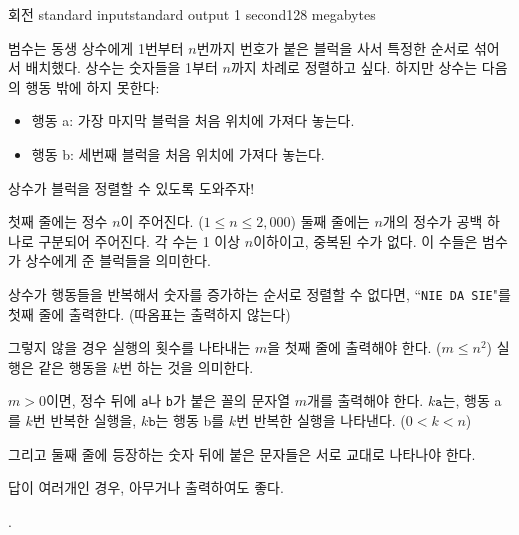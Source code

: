\begin{problem}{회전}
	{standard input}{standard output}
	{1 second}{128 megabytes}{}
	
	
	범수는 동생 상수에게 1번부터 $n$번까지 번호가 붙은 블럭을 사서 특정한 순서로 섞어서 배치했다. 상수는 숫자들을 1부터 $n$까지 차례로 정렬하고 싶다. 하지만 상수는 다음의 행동 밖에 하지 못한다:
	
	\begin{itemize}
		\item 행동 a: 가장 마지막 블럭을 처음 위치에 가져다 놓는다.
		\item 행동 b: 세번째 블럭을 처음 위치에 가져다 놓는다.
	\end{itemize}
	
	상수가 블럭을 정렬할 수 있도록 도와주자!
	
	
	\InputFile
	
	첫째 줄에는 정수 $n$이 주어진다. ($1 \le n \le 2,000$) 둘째 줄에는 $n$개의 정수가 공백 하나로 구분되어 주어진다. 각 수는 1 이상 $n$이하이고, 중복된 수가 없다. 이 수들은 범수가 상수에게 준 블럭들을 의미한다.
	
	\OutputFile
	
	상수가 행동들을 반복해서 숫자를 증가하는 순서로 정렬할 수 없다면,  ``\texttt{NIE DA SIE}"를 첫째 줄에 출력한다. (따옴표는 출력하지 않는다)

	그렇지 않을 경우 실행의 횟수를 나타내는 $m$을 첫째 줄에 출력해야 한다. ($m\le n^2$) 실행은 같은 행동을 $k$번 하는 것을 의미한다.
	
	$m > 0$이면, 정수 뒤에 \texttt{a}나 \texttt{b}가 붙은 꼴의 문자열 $m$개를 출력해야 한다. $k\texttt{a}$는, 행동 a를 $k$번 반복한 실행을, $k\texttt{b}$는 행동 b를 $k$번 반복한 실행을 나타낸다. ($0 < k < n$)

	그리고 둘째 줄에 등장하는 숫자 뒤에 붙은 문자들은 서로 교대로 나타나야 한다.
	
	답이 여러개인 경우, 아무거나 출력하여도 좋다.
	
	\Examples
		
	\begin{example}
	\end{example}
	.
        
\end{problem}

